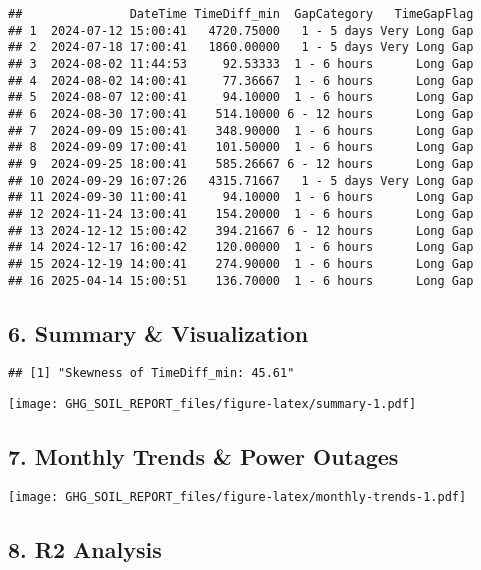 \documentclass[
]{article}
\begin{document}
\begin{verbatim}
##               DateTime TimeDiff_min  GapCategory   TimeGapFlag
## 1  2024-07-12 15:00:41   4720.75000   1 - 5 days Very Long Gap
## 2  2024-07-18 17:00:41   1860.00000   1 - 5 days Very Long Gap
## 3  2024-08-02 11:44:53     92.53333  1 - 6 hours      Long Gap
## 4  2024-08-02 14:00:41     77.36667  1 - 6 hours      Long Gap
## 5  2024-08-07 12:00:41     94.10000  1 - 6 hours      Long Gap
## 6  2024-08-30 17:00:41    514.10000 6 - 12 hours      Long Gap
## 7  2024-09-09 15:00:41    348.90000  1 - 6 hours      Long Gap
## 8  2024-09-09 17:00:41    101.50000  1 - 6 hours      Long Gap
## 9  2024-09-25 18:00:41    585.26667 6 - 12 hours      Long Gap
## 10 2024-09-29 16:07:26   4315.71667   1 - 5 days Very Long Gap
## 11 2024-09-30 11:00:41     94.10000  1 - 6 hours      Long Gap
## 12 2024-11-24 13:00:41    154.20000  1 - 6 hours      Long Gap
## 13 2024-12-12 15:00:42    394.21667 6 - 12 hours      Long Gap
## 14 2024-12-17 16:00:42    120.00000  1 - 6 hours      Long Gap
## 15 2024-12-19 14:00:41    274.90000  1 - 6 hours      Long Gap
## 16 2025-04-14 15:00:51    136.70000  1 - 6 hours      Long Gap
\end{verbatim}

\hypertarget{summary-visualization}{%
\subsection{6. Summary \& Visualization}\label{summary-visualization}}

\begin{verbatim}
## [1] "Skewness of TimeDiff_min: 45.61"
\end{verbatim}

\texttt{[image: GHG\_SOIL\_REPORT\_files/figure-latex/summary-1.pdf]}

\hypertarget{monthly-trends-power-outages}{%
\subsection{7. Monthly Trends \& Power
Outages}\label{monthly-trends-power-outages}}

\texttt{[image: GHG\_SOIL\_REPORT\_files/figure-latex/monthly-trends-1.pdf]}

\hypertarget{r2-analysis}{%
\subsection{8. R2 Analysis}\label{r2-analysis}}
\end{document}
